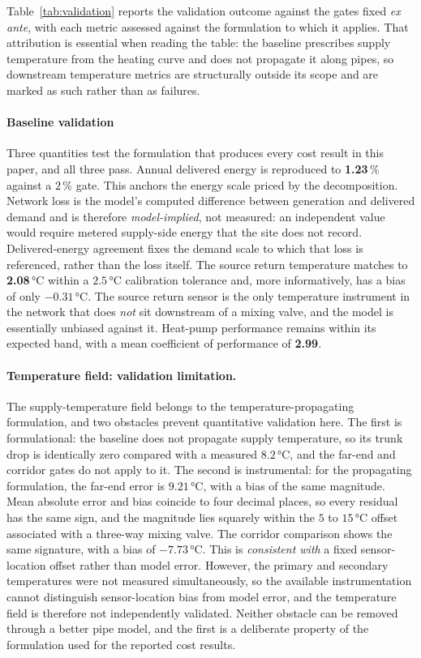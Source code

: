 
Table~\ref{tab:validation} reports the validation outcome against the gates fixed
\emph{ex ante}, with each metric assessed against the formulation to which it applies. That
attribution is essential when reading the table: the baseline prescribes supply temperature
from the heating curve and does not propagate it along pipes, so downstream temperature
metrics are structurally outside its scope and are marked as such rather than as failures.

\paragraph{Baseline validation}
Three quantities test the formulation that produces every cost result in this paper, and all
three pass. Annual delivered energy is reproduced to \textbf{1.23}\,\% against a \(2\,\%\)
gate. This anchors the energy scale priced by the decomposition. Network loss is the model's
computed difference between generation and delivered demand and is therefore
\emph{model-implied}, not measured: an independent value would require metered supply-side
energy that the site does not record. Delivered-energy agreement fixes the demand scale to
which that loss is referenced, rather than the loss itself.
The source return temperature matches to \textbf{2.08}\,°C within a \(2.5\)\,°C calibration
tolerance and,
more informatively, has a bias of only \(-0.31\)\,°C. The source return sensor is the only
temperature instrument in the network that does \emph{not} sit downstream of a mixing valve,
and the model is essentially unbiased against it. Heat-pump performance remains within its
expected band, with a mean coefficient of performance of \textbf{2.99}.

\paragraph{Temperature field: validation limitation.}
The supply-temperature field belongs to the temperature-propagating formulation, and two
obstacles prevent quantitative validation here. The first is formulational: the baseline does
not propagate supply temperature, so its trunk drop is identically zero compared with a
measured \(8.2\)\,°C, and the far-end and corridor gates do not apply to it. The second is
instrumental: for the propagating formulation, the far-end error is \(9.21\)\,°C, with a bias
of the same magnitude. Mean absolute error and bias coincide to four decimal places, so every
residual has the same sign, and the magnitude lies squarely within the \(5\) to \(15\)\,°C
offset associated with a three-way mixing valve. The corridor comparison shows the same
signature, with a bias of \(-7.73\)\,°C. This is \emph{consistent with} a fixed sensor-location
offset rather than model error. However, the primary and secondary temperatures were not
measured simultaneously, so the available instrumentation cannot distinguish sensor-location
bias from model error, and the temperature field is therefore not independently validated.
Neither obstacle can be removed through a better pipe model, and the first is a deliberate
property of the formulation used for the reported cost results.

